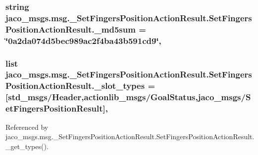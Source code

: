 \subsubsection[{\texorpdfstring{\+\_\+md5sum}{_md5sum}}]{\setlength{\rightskip}{0pt plus 5cm}string jaco\+\_\+msgs.\+msg.\+\_\+\+Set\+Fingers\+Position\+Action\+Result.\+Set\+Fingers\+Position\+Action\+Result.\+\_\+md5sum = \char`\"{}0a2da074d5bec989ac2f4ba43b591cd9\char`\"{}\hspace{0.3cm}{\ttfamily [static]}, {\ttfamily [private]}}\hypertarget{classjaco__msgs_1_1msg_1_1__SetFingersPositionActionResult_1_1SetFingersPositionActionResult_a0f7fdf49040c3c4a99e08370b6f1a780}{}\label{classjaco__msgs_1_1msg_1_1__SetFingersPositionActionResult_1_1SetFingersPositionActionResult_a0f7fdf49040c3c4a99e08370b6f1a780}
\subsubsection[{\texorpdfstring{\+\_\+slot\+\_\+types}{_slot_types}}]{\setlength{\rightskip}{0pt plus 5cm}list jaco\+\_\+msgs.\+msg.\+\_\+\+Set\+Fingers\+Position\+Action\+Result.\+Set\+Fingers\+Position\+Action\+Result.\+\_\+slot\+\_\+types = \mbox{[}\textquotesingle{}std\+\_\+msgs/Header\textquotesingle{},\textquotesingle{}actionlib\+\_\+msgs/Goal\+Status\textquotesingle{},\textquotesingle{}jaco\+\_\+msgs/{\bf Set\+Fingers\+Position\+Result}\textquotesingle{}\mbox{]}\hspace{0.3cm}{\ttfamily [static]}, {\ttfamily [private]}}\hypertarget{classjaco__msgs_1_1msg_1_1__SetFingersPositionActionResult_1_1SetFingersPositionActionResult_a1136051749710ab7892e2d1f2d95fc2e}{}\label{classjaco__msgs_1_1msg_1_1__SetFingersPositionActionResult_1_1SetFingersPositionActionResult_a1136051749710ab7892e2d1f2d95fc2e}


Referenced by jaco\+\_\+msgs.\+msg.\+\_\+\+Set\+Fingers\+Position\+Action\+Result.\+Set\+Fingers\+Position\+Action\+Result.\+\_\+get\+\_\+types().


